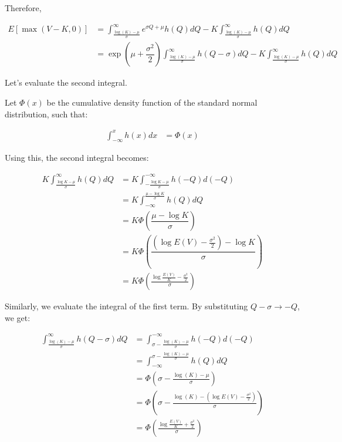 \documentclass[uplatex]{jsarticle}
\begin{document}
Therefore,

\begin{align}
	E \left[ \max(V-K,0) \right] & = \int^{\infty}_{\frac{\log(K) - \mu}{\sigma}} e^{\sigma Q + \mu } h(Q) dQ - K \int^{\infty}_{\frac{\log(K) - \mu}{\sigma}} h(Q) dQ\\
	 & = \exp( \mu + \dfrac{\sigma^{2} }{2}) \int^{\infty}_{\frac{\log(K) - \mu}{\sigma}} h(Q - \sigma) dQ - K \int^{\infty}_{\frac{\log(K) - \mu}{\sigma}} h(Q) dQ
\end{align}

Let's evaluate the second integral.

Let $\Phi (x)$ be the cumulative density function of the standard normal distribution, such that:

\begin{align}
	\int^{x}_{-\infty} h(x) dx & = \Phi (x)
\end{align}

Using this, the second integral becomes:

\begin{align}
	K \int^{\infty}_{\frac{\log K - \mu}{\sigma}} h(Q) dQ & = K \int_{-\frac{\log K - \mu}{\sigma}}^{-\infty} h(-Q) d(-Q)\\
	& = K \int^{\frac{ \mu - \log K }{\sigma}}_{-\infty} h(Q) dQ \\
	& = K \Phi \left( \dfrac{ \mu - \log K }{\sigma} \right) \\
	& = K \Phi \left( \dfrac{ \left( \log E(V) - \frac{\sigma^{2}}{2} \right) - \log K }{\sigma} \right) \\
	& = K \Phi \left( \frac{\log\frac{E(V)}{K} - \frac{\sigma^{2}}{2} }{\sigma} \right)
\end{align}

Similarly, we evaluate the integral of the first term. By substituting $Q-\sigma \to -Q$, we get:

\begin{align}
	\int^{\infty}_{\frac{\log(K) - \mu}{\sigma}} h(Q - \sigma) dQ & = \int^{-\infty}_{\sigma - \frac{\log(K) - \mu}{\sigma}} h(-Q) d(-Q) \\
	& = \int_{-\infty}^{\sigma - \frac{\log(K) - \mu}{\sigma}} h(Q) dQ \\
	& = \Phi \left( \sigma - \frac{\log(K) - \mu}{\sigma} \right)\\
	& = \Phi \left( \sigma - \frac{\log(K) - \left( \log E(V) - \frac{\sigma^{2}}{2} \right) }{\sigma} \right) \\
	& = \Phi \left( \frac{ \log \frac{E(V)}{K} + \frac{\sigma^{2}}{2} }{\sigma} \right)
\end{align}
\end{document}
